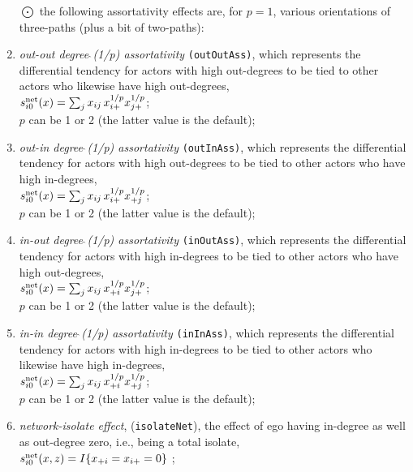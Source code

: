 \documentclass[a4paper,fleqn,11pt]{article}
\newcommand{\+}{\, + \,}
\newcommand{\vit}{\theenumi}
\begin{document}
\begin{enumerate}
 \item[{\hspace*{-1ex}$\bigodot$}] the following assortativity effects are,
 for $p=1$, various orientations of three-paths (plus a bit of two-paths):\\

 \item {\em out-out degree$\,\hat{\ }$(1/p) assortativity}
 \texttt{(outOutAss)},
 which represents the differential tendency for actors with high out-degrees
 to be tied to other actors who likewise have high out-degrees,\\
 $s^{\rm net}_{i\vit}(x) = \sum_j x_{ij}\, {x_{i+}^{1/p}} {x_{j+}^{1/p}} $;\\
 $p$ can be 1 or 2 (the latter value is the default);

 \item {\em out-in degree$\,\hat{\ }$(1/p) assortativity}
 \texttt{(outInAss)},
 which represents the differential tendency for actors with high out-degrees
 to be tied to other actors who have high in-degrees,\\
 $s^{\rm net}_{i\vit}(x) = \sum_j x_{ij}\, {x_{i+}^{1/p}} {x_{+j}^{1/p}} $;\\
 $p$ can be 1 or 2 (the latter value is the default);

 \item {\em in-out degree$\,\hat{\ }$(1/p) assortativity}
 \texttt{(inOutAss)},
 which represents the differential tendency for actors with high in-degrees
 to be tied to other actors who have high out-degrees,\\
 $s^{\rm net}_{i\vit}(x) = \sum_j x_{ij}\, {x_{+i}^{1/p}} {x_{j+}^{1/p}} $;\\
 $p$ can be 1 or 2 (the latter value is the default);

 \item {\em in-in degree$\,\hat{\ }$(1/p) assortativity}
 \texttt{(inInAss)},
 which represents the differential tendency for actors with high in-degrees
 to be tied to other actors who likewise have high in-degrees,\\
 $s^{\rm net}_{i\vit}(x) = \sum_j x_{ij}\, {x_{+i}^{1/p}} {x_{+j}^{1/p}} $;\\
 $p$ can be 1 or 2 (the latter value is the default);

\item \emph{network-isolate effect}, (\texttt{isolateNet}), the effect of ego having
      in-degree as well as out-degree zero, i.e., being a total isolate,\\
 $s^{\rm net}_{i\vit}(x, z) =   I\{x_{+i} = x_{i+} = 0 \}  $ ;


\end{enumerate}
\end{document}
